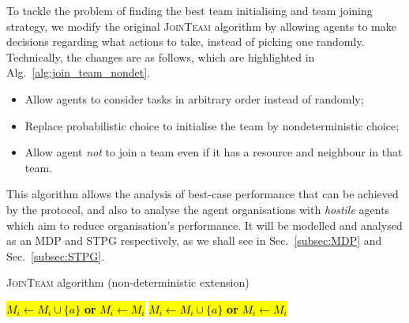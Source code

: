\documentclass{llncs}
\begin{document}
To tackle the problem of finding the best team initialising and team joining strategy, we modify the original \textsc{JoinTeam} algorithm by
allowing agents to make decisions regarding what actions to take, instead of picking one randomly. Technically, the changes are as follows, which
are highlighted in Alg.~\ref{alg:join_team_nondet}.
\begin{itemize}
 \item Allow agents to consider tasks in arbitrary order instead of randomly;
 \item Replace probabilistic choice to initialise the team by nondeterministic choice;
 \item Allow agent \emph{not} to join a team even if it has a resource and neighbour in that team.
\end{itemize}
This algorithm allows the analysis of best-case performance that can be achieved by the protocol, and also to analyse the agent organisations with \emph{hostile} agents which aim to reduce organisation's performance. It will be modelled and analysed as an MDP and STPG respectively, as we shall see in Sec.~\ref{subsec:MDP} and Sec.~\ref{subsec:STPG}.
\begin{algorithm}[h]
\caption{\textsc{JoinTeam} algorithm (non-deterministic extension)}
\label{alg:join_team_nondet}
\begin{scriptsize}
\begin{algorithmic}
     
       
	 
	    \State \hl{$M_i \leftarrow M_i \cup \{a\}$  \textbf{or} $M_i \leftarrow M_i$} 
	\EndIf
       
	 
	  \State \hl{$M_i \leftarrow M_i \cup \{a\}$ \textbf{or} $M_i \leftarrow M_i$} 
	\EndIf
      \EndIf
    \EndIf
  \EndFor
\EndProcedure
\end{algorithmic}
\end{scriptsize}
\end{algorithm}
\end{document}
